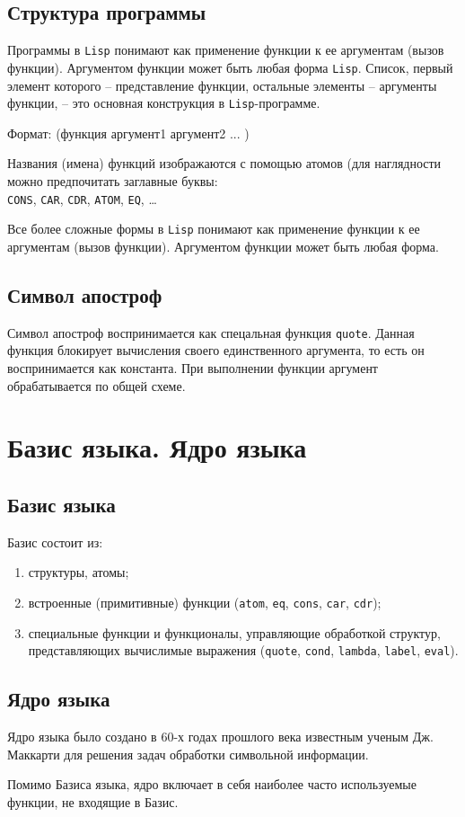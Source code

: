 \subsection*{Структура программы}

Программы в \texttt{Lisp} понимают как применение функции к ее аргументам (вызов функции). Аргументом функции может быть любая форма \texttt{Lisp}. Список, первый элемент
которого -- представление функции, остальные элементы -- аргументы функции, -- это основная конструкция в \texttt{Lisp}-программе.

Формат: (функция аргумент1 аргумент2 ... )

Названия (имена) функций изображаются с помощью атомов (для наглядности можно предпочитать заглавные буквы: \\\texttt{CONS}, \texttt{CAR}, \texttt{CDR}, \texttt{ATOM}, \texttt{EQ}, \dots

Все более сложные формы в \texttt{Lisp} понимают как применение функции к ее аргументам (вызов функции). Аргументом функции может быть любая форма.

\subsection*{Символ апостроф}

Символ апостроф воспринимается как спецальная функция \texttt{quote}. Данная функция блокирует вычисления своего единственного аргумента, то есть он воспринимается как константа. При выполнении функции аргумент обрабатывается по общей схеме.

\section{Базис языка. Ядро языка}

\subsection*{Базис языка}

Базис состоит из:
\begin{enumerate}
    \item структуры, атомы;
    \item встроенные (примитивные) функции (\texttt{atom}, \texttt{eq}, \texttt{cons}, \texttt{car}, \texttt{cdr});
    \item специальные функции и функционалы, управляющие обработкой структур, представляющих вычислимые выражения (\texttt{quote}, \texttt{cond}, \texttt{lambda}, \texttt{label}, \texttt{eval}).
\end{enumerate}

\subsection*{Ядро языка}

Ядро языка было создано в 60-х годах прошлого века известным ученым Дж. Маккарти для решения задач обработки символьной информации.

Помимо Базиса языка, ядро включает в себя наиболее часто используемые функции, не входящие в Базис.